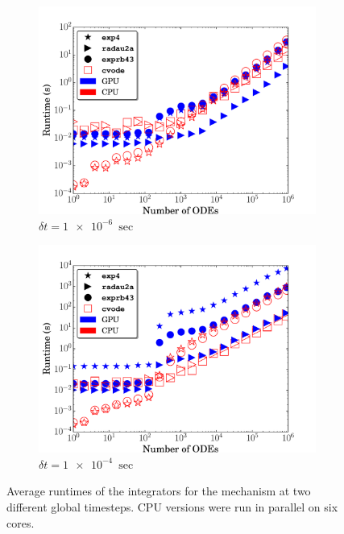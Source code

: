 \documentclass[preprint]{elsarticle}
\begin{document}
\begin{figure}[h]
  \centering
  \begin{subfigure}{0.49\textwidth}
      \includegraphics[width=\linewidth]{H2_1e-06_cpuvsgpu.pdf}
      \caption{$\delta t = \SI{1e-6}{\sec}$}   
  \end{subfigure}
  \begin{subfigure}{0.49\textwidth}
      \includegraphics[width=\linewidth]{H2_1e-04_cpuvsgpu.pdf}
      \caption{$\delta t = \SI{1e-4}{\sec}$}
  \end{subfigure}
  \caption{Average runtimes of the integrators for the  mechanism at two different global timesteps. 
  CPU versions were run in parallel on six cores.}
  \label{F:H2_perf}
\end{figure}
\end{document}
